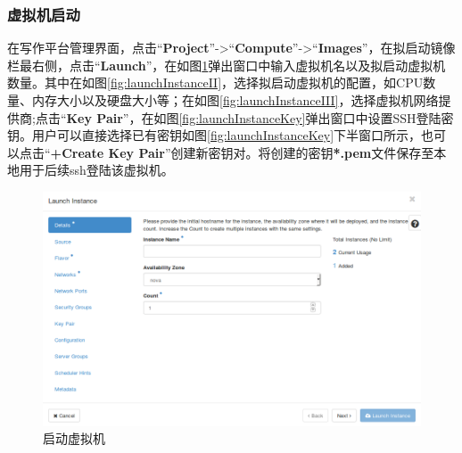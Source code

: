\documentclass[12pt]{article}
\begin{document}
\subsubsection{虚拟机启动}
在写作平台管理界面，点击``\textbf{Project}''->``\textbf{Compute}''->``\textbf{Images}''，在拟启动镜像栏最右侧，点击``\textbf{Launch}''，在如图\ref{fig:launchInstanceI}弹出窗口中输入虚拟机名以及拟启动虚拟机数量。其中在如图\ref{fig:launchInstanceII}，选择拟启动虚拟机的配置，如CPU数量、内存大小以及硬盘大小等；在如图\ref{fig:launchInstanceIII}，选择虚拟机网络提供商;点击``\textbf{Key Pair}''，在如图\ref{fig:launchInstanceKey}弹出窗口中设置SSH登陆密钥。用户可以直接选择已有密钥如图\ref{fig:launchInstanceKey}下半窗口所示，也可以点击``\textbf{+Create Key Pair}''创建新密钥对。将创建的密钥\textbf{*.pem}文件保存至本地用于后续ssh登陆该虚拟机。
\begin{figure}[!htb]
\centering
\includegraphics[width=6in]{./figures/launchInstanceI}
\caption{启动虚拟机}
\label{fig:launchInstanceI}
\end{figure}
\end{document}
